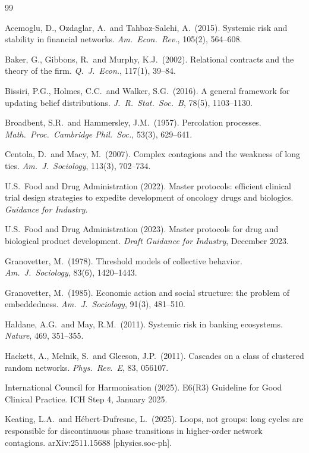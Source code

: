 \documentclass[11pt,a4paper]{article}
\begin{document}
\begin{thebibliography}{99}

Acemoglu, D., Ozdaglar, A.\ and Tahbaz-Salehi, A.\ (2015).
Systemic risk and stability in financial networks.
\emph{Am.\ Econ.\ Rev.}, 105(2), 564--608.

Baker, G., Gibbons, R.\ and Murphy, K.J.\ (2002).
Relational contracts and the theory of the firm.
\emph{Q.\ J.\ Econ.}, 117(1), 39--84.

Bissiri, P.G., Holmes, C.C.\ and Walker, S.G.\ (2016).
A general framework for updating belief distributions.
\emph{J.\ R.\ Stat.\ Soc.\ B}, 78(5), 1103--1130.

Broadbent, S.R.\ and Hammersley, J.M.\ (1957).
Percolation processes.
\emph{Math.\ Proc.\ Cambridge Phil.\ Soc.}, 53(3), 629--641.

Centola, D.\ and Macy, M.\ (2007).
Complex contagions and the weakness of long ties.
\emph{Am.\ J.\ Sociology}, 113(3), 702--734.

U.S.\ Food and Drug Administration (2022).
Master protocols: efficient clinical trial design strategies to expedite development of oncology drugs and biologics.
\emph{Guidance for Industry}.

U.S.\ Food and Drug Administration (2023).
Master protocols for drug and biological product development.
\emph{Draft Guidance for Industry}, December 2023.

Granovetter, M.\ (1978).
Threshold models of collective behavior.
\emph{Am.\ J.\ Sociology}, 83(6), 1420--1443.

Granovetter, M.\ (1985).
Economic action and social structure: the problem of embeddedness.
\emph{Am.\ J.\ Sociology}, 91(3), 481--510.

Haldane, A.G.\ and May, R.M.\ (2011).
Systemic risk in banking ecosystems.
\emph{Nature}, 469, 351--355.

Hackett, A., Melnik, S.\ and Gleeson, J.P.\ (2011).
Cascades on a class of clustered random networks.
\emph{Phys.\ Rev.\ E}, 83, 056107.

International Council for Harmonisation (2025).
E6(R3) Guideline for Good Clinical Practice.
ICH Step 4, January 2025.

Keating, L.A.\ and H\'ebert-Dufresne, L.\ (2025).
Loops, not groups: long cycles are responsible for discontinuous phase transitions in higher-order network contagions.
arXiv:2511.15688 [physics.soc-ph].


\end{thebibliography}
\end{document}
